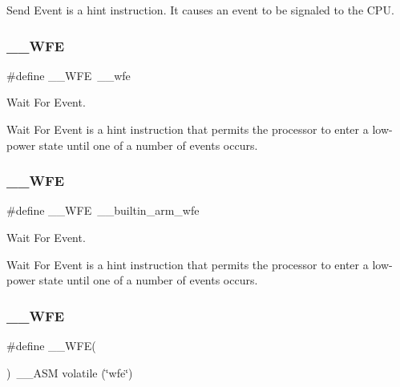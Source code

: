 Send Event is a hint instruction. It causes an event to be signaled to the C\+PU. \mbox{\label{group___c_m_s_i_s___core___instruction_interface_gaac6cc7dd4325d9cb40d3290fa5244b3d}} 
\subsubsection{\texorpdfstring{\_\_WFE}{\_\_WFE}\hspace{0.1cm}{\footnotesize\ttfamily [1/3]}}
{\footnotesize\ttfamily \#define \+\_\+\+\_\+\+W\+FE~\+\_\+\+\_\+wfe}



Wait For Event. 

Wait For Event is a hint instruction that permits the processor to enter a low-\/power state until one of a number of events occurs. \mbox{\label{group___c_m_s_i_s___core___instruction_interface_gaac6cc7dd4325d9cb40d3290fa5244b3d}} 
\subsubsection{\texorpdfstring{\_\_WFE}{\_\_WFE}\hspace{0.1cm}{\footnotesize\ttfamily [2/3]}}
{\footnotesize\ttfamily \#define \+\_\+\+\_\+\+W\+FE~\+\_\+\+\_\+builtin\+\_\+arm\+\_\+wfe}



Wait For Event. 

Wait For Event is a hint instruction that permits the processor to enter a low-\/power state until one of a number of events occurs. \mbox{\label{group___c_m_s_i_s___core___instruction_interface_gaf0330712223f4cfb6091e4ab84775f73}} 
\subsubsection{\texorpdfstring{\_\_WFE}{\_\_WFE}\hspace{0.1cm}{\footnotesize\ttfamily [3/3]}}
{\footnotesize\ttfamily \#define \+\_\+\+\_\+\+W\+FE(\begin{DoxyParamCaption}{ }\end{DoxyParamCaption})~\+\_\+\+\_\+\+A\+SM volatile (\char`\"{}wfe\char`\"{})}



